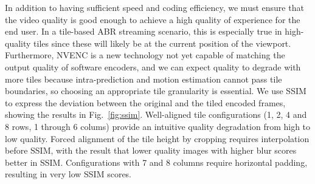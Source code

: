 In addition to having sufficient speed and coding efficiency, we must ensure that the video quality is good enough to achieve a high quality of experience for the end user.
In a tile-based ABR streaming scenario, this is especially true in high-quality tiles since these will likely be at the current position of the viewport.
Furthermore, NVENC is a new technology not yet capable of matching the output quality of software encoders, and we can expect quality to degrade with more tiles because intra-prediction and motion estimation cannot pass tile boundaries, so choosing an appropriate tile granularity is essential.
We use SSIM to express the deviation between the original and the tiled encoded frames, showing the results in Fig.~\ref{fig:ssim}.
Well-aligned tile configurations (1, 2, 4 and 8 rows, 1 through 6 colums) provide an intuitive quality degradation from high to low quality. Forced alignment of the tile height by cropping requires interpolation before SSIM, with the result that lower quality images with higher blur scores better in SSIM. Configurations with 7 and 8 columns require horizontal padding, resulting in very low SSIM scores.


